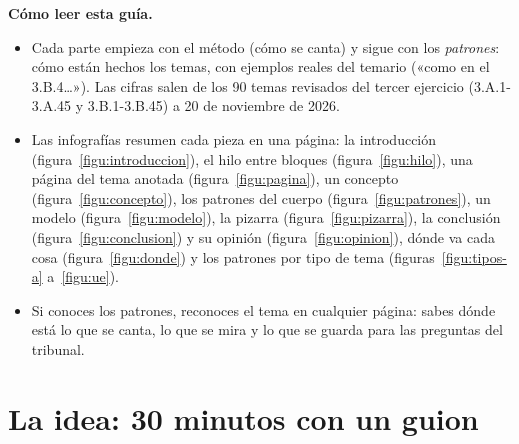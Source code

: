 \documentclass[11pt]{article}
\begin{document}
\begin{anotaciones}
\textbf{Cómo leer esta guía.}
\begin{itemize}
\item Cada parte empieza con el método (cómo se canta) y sigue con los \emph{patrones}: cómo están hechos los temas, con ejemplos reales del temario («como en el 3.B.4…»). Las cifras salen de los 90 temas revisados del tercer ejercicio (3.A.1-3.A.45 y 3.B.1-3.B.45) a 20 de noviembre de 2026.
\item Las infografías resumen cada pieza en una página: la introducción (figura~\ref{figu:introduccion}), el hilo entre bloques (figura~\ref{figu:hilo}), una página del tema anotada (figura~\ref{figu:pagina}), un concepto (figura~\ref{figu:concepto}), los patrones del cuerpo (figura~\ref{figu:patrones}), un modelo (figura~\ref{figu:modelo}), la pizarra (figura~\ref{figu:pizarra}), la conclusión (figura~\ref{figu:conclusion}) y su opinión (figura~\ref{figu:opinion}), dónde va cada cosa (figura~\ref{figu:donde}) y los patrones por tipo de tema (figuras~\ref{figu:tipos-a} a~\ref{figu:ue}).
\item Si conoces los patrones, reconoces el tema en cualquier página: sabes dónde está lo que se canta, lo que se mira y lo que se guarda para las preguntas del tribunal.
\end{itemize}
\end{anotaciones}

\section*{La idea: 30 minutos con un guion}
\end{document}
